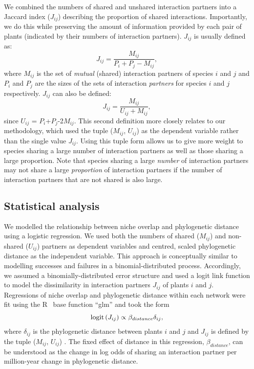 \documentclass[12pt]{article}
\begin{document}
\begin{spacing}{1.5}
    We combined the numbers of shared and unshared interaction partners
    into a Jaccard index ($J_{ij}$) describing 
    the proportion of shared interactions. Importantly, we do this while 
    preserving the amount of information provided by each pair of plants
    (indicated by their numbers of interaction partners). $J_{ij}$ is usually defined as: 
    \begin{equation}
      J_{ij} = \frac{M_{ij}}{P_i+P_j-M_{ij}} ,
    \end{equation}
    where $M_{ij}$ is the set of \emph{mutual} (shared) interaction partners of 
    species $i$ and $j$ and $P_i$ and $P_j$ are the sizes of the sets of interaction 
    \emph{partners} for species $i$ and $j$ respectively. $J_{ij}$ can also be defined:
    \begin{equation}
      J_{ij} = \frac{M_{ij}}{U_{ij}+M_{ij}} ,
    \end{equation}
    since $U_{ij}$ = $P_{i}$+$P_{j}$-2$M_{ij}$. This second definition more closely
    relates to our methodology, which used the tuple ($M_{ij}$, $U_{ij}$) as the
    dependent variable rather than the single value $J_{ij}$. Using this tuple form
    allows us to give more 
    weight to species sharing a large number of interaction partners as well as 
    those sharing a large proportion. Note that species sharing a large \emph{number} of interaction partners may not share a large \emph{proportion} of interaction partners if the number of interaction partners that are not shared is also large. %


  \subsection*{Statistical analysis} 

    We modelled the relationship between niche overlap and phylogenetic 
    distance using a logistic regression. We used both the numbers of shared 
    ($M_{ij}$) and non-shared ($U_{ij}$) partners as dependent variables and 
    centred, scaled phylogenetic distance as the independent variable. This 
    approach is conceptually similar to modelling successes and failures in a 
    binomial-distributed process. Accordingly, we assumed a binomially-distributed error structure and used a logit link function to model the dissimilarity in interaction partners 
    $J_{ij}$ of plants $i$ and $j$. Regressions of niche overlap and 
    phylogenetic distance within 
    each network were fit using the R~\citep{R} base function ``glm'' and 
    took the form
      \begin{equation}
        {\rm logit}\left(J_{ij}\right) \propto \beta_{distance}\delta_{ij} ,
        \label{basic}
      \end{equation}
    where $\delta_{ij}$ is the phylogenetic distance between plants $i$ and 
    $j$ and $J_{ij}$ is defined by the tuple ($M_{ij}$, $U_{ij}$) . 
    The fixed effect of distance in this regression, $\beta_{distance}$, 
    can be understood as the change in log odds of sharing an interaction 
    partner per million-year change in phylogenetic distance. 



\end{spacing}
\end{document}
